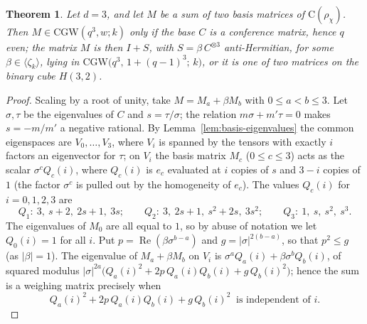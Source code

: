 \documentclass{article}
\newtheorem{theorem}{Theorem}[section]
\theoremstyle{definition}
\theoremstyle{remark}
\newcommand{\Cr}{\mathrm{C}}
\newcommand{\CGW}{\mathrm{CGW}}
\begin{document}
\begin{theorem}\label{thm:two-relation}
Let $d=3$, and let $M$ be a sum of two basis matrices of $\Cr(\rho_\chi)$. Then $M \in \mathrm{CGW}(q^{3},w;k)$
only if the base $C$ is a conference matrix, hence $q$ even; the matrix $M$ is then
$I+S$, with $S=\beta\,C^{\otimes3}$ anti-Hermitian, for some $\beta \in \langle \zeta_{k} \rangle$, lying in
$\CGW\bigl(q^3,\,1+(q-1)^3;\,k\bigr)$, or it is one of two matrices on the binary
cube $H(3,2)$.
\end{theorem}

\begin{proof}
Scaling by a root of unity, take $M = M_a+\beta M_b$
with $0\le a<b\le3$.  Let $\sigma,\tau$ be the
eigenvalues of $C$ and $s=\tau/\sigma$; the relation $m\sigma+m'\tau=0$ makes
$s=-m/m'$ a negative rational.  By Lemma~\ref{lem:basis-eigenvalues} the common
eigenspaces are $V_0,\dots,V_3$, where $V_i$ is spanned by the tensors with
exactly $i$ factors an eigenvector for $\tau$; on $V_i$ the basis matrix $M_c$
($0\le c\le3$) acts as the scalar $\sigma^{c}Q_c(i)$, where $Q_c(i)$ is $e_c$
evaluated at $i$ copies of $s$ and $3-i$ copies of $1$ (the factor $\sigma^{c}$ is
pulled out by the homogeneity of $e_c$).  The values $Q_c(i)$ for $i=0,1,2,3$ are
\[
  Q_1:\ 3,\ s{+}2,\ 2s{+}1,\ 3s; \qquad
  Q_2:\ 3,\ 2s{+}1,\ s^2{+}2s,\ 3s^2; \qquad
  Q_3:\ 1,\ s,\ s^2,\ s^3.
\]
The eigenvalues of $M_{0}$ are all equal to $1$, so by abuse of notation we let $Q_{0}(i) = 1$ for all $i$. Put $p=\operatorname{Re}(\beta\sigma^{b-a})$ and $g=|\sigma|^{2(b-a)}$, so that
$p^2\le g$ (as $|\beta|=1$).  The eigenvalue of $M_a+\beta M_b$ on $V_i$ is
$\sigma^{a}Q_a(i)+\beta\sigma^{b}Q_b(i)$, of squared modulus
$|\sigma|^{2a}\bigl(Q_a(i)^2+2p\,Q_a(i)Q_b(i)+g\,Q_b(i)^2\bigr)$; hence the sum is
a weighing matrix precisely when
\begin{equation}\label{eq:wm-flat}
  Q_a(i)^2+2p\,Q_a(i)Q_b(i)+g\,Q_b(i)^2\ \text{ is independent of } i.
\end{equation}


\end{proof}
\end{document}
